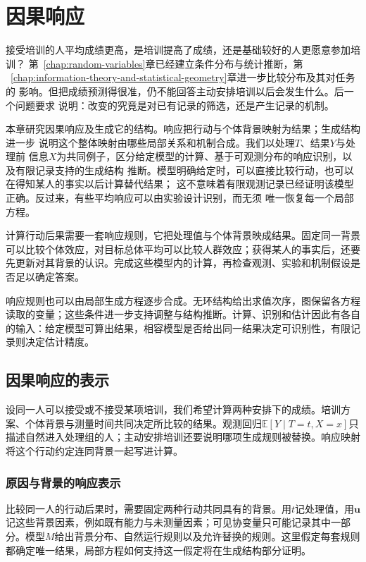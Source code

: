 \chapter{因果响应}
\label{chap:causal-inference}

接受培训的人平均成绩更高，是培训提高了成绩，还是基础较好的人更愿意参加培训？
第~\ref{chap:random-variables}章已经建立条件分布与统计推断，第
~\ref{chap:information-theory-and-statistical-geometry}章进一步比较分布及其对任务的
影响。但把成绩预测得很准，仍不能回答主动安排培训以后会发生什么。后一个问题要求
说明：改变的究竟是对已有记录的筛选，还是产生记录的机制。

本章研究因果响应及生成它的结构。响应把行动与个体背景映射为结果；生成结构进一步
说明这个整体映射由哪些局部关系和机制合成。我们以处理\(T\)、结果\(Y\)与处理前
信息\(X\)为共同例子，区分给定模型的计算、基于可观测分布的响应识别，以及有限记录支持的生成结构
推断。模型明确给定时，可以直接比较行动，也可以在得知某人的事实以后计算替代结果；
这不意味着有限观测记录已经证明该模型正确。反过来，有些平均响应可以由实验设计识别，而无须
唯一恢复每一个局部方程。

计算行动后果需要一套响应规则，它把处理值与个体背景映成结果。固定同一背景可以比较个体效应，对目标总体平均可以比较人群效应；获得某人的事实后，还要先更新对其背景的认识。完成这些模型内的计算，再检查观测、实验和机制假设是否足以确定答案。

响应规则也可以由局部生成方程逐步合成。无环结构给出求值次序，图保留各方程读取的变量；这些条件进一步支持调整与结构推断。计算、识别和估计因此有各自的输入：给定模型可算出结果，相容模型是否给出同一结果决定可识别性，有限记录则决定估计精度。

\section{因果响应的表示}
\label{sec:causal-response-representation}

设同一人可以接受或不接受某项培训，我们希望计算两种安排下的成绩。培训方案、个体背景与测量时间共同决定所比较的结果。观测回归\(\mathbb E[Y\mid T=t,X=x]\)只描述自然进入处理组的人；主动安排培训还要说明哪项生成规则被替换。响应映射将这个行动约定连同背景一起写进计算。

\subsection{原因与背景的响应表示}
\label{sec:causal-observation-generation}

比较同一人的行动后果时，需要固定两种行动共同具有的背景。用\(t\)记处理值，用\(\bm u\)记这些背景因素，例如既有能力与未测量因素；可见协变量只可能记录其中一部分。模型\(M\)给出背景分布、自然运行规则以及允许替换的规则。这里假定每套规则都确定唯一结果，局部方程如何支持这一假定将在生成结构部分证明。

